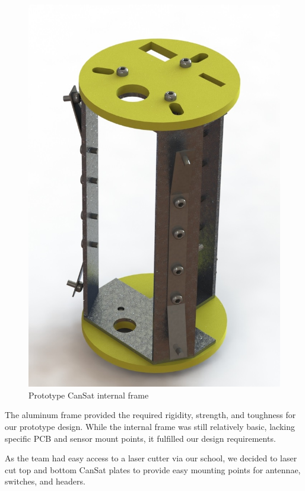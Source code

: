 \documentclass[]{report}
\begin{document}
		 \begin{figure}[h]
		 	\hfill\includegraphics[scale=0.4]{old_int_frame.jpg}\hspace*{\fill}
		 	\caption{Prototype CanSat internal frame}
		 	\label{intframeold}
		 \end{figure}
		 
		 The aluminum frame provided the required rigidity, strength, and toughness for our prototype design. While the internal frame was still relatively basic, lacking specific PCB and sensor mount points, it fulfilled our design requirements.
		 
		 As the team had easy access to a laser cutter via our school, we decided to laser cut top and bottom CanSat plates to provide easy mounting points for antennae, switches, and headers.
		 
\end{document}
